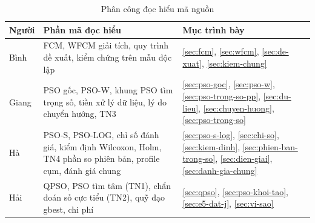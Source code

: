 \begin{table}[H]
\centering
\caption{Phân công đọc hiểu mã nguồn}\label{tab:pl-phan-cong}
\small
\begin{tabular}{@{}l>{\raggedright\arraybackslash}p{7.6cm}>{\raggedright\arraybackslash}p{3.6cm}@{}}
\toprule
\textbf{Người} & \textbf{Phần mã đọc hiểu} & \textbf{Mục trình bày} \\
\midrule
Bình & FCM, WFCM giải tích, quy trình đề xuất, kiểm chứng trên mẫu độc lập & \ref{sec:fcm}, \ref{sec:wfcm}, \ref{sec:de-xuat}, \ref{sec:kiem-chung} \\
Giang & PSO gốc, PSO-W, khung PSO tìm trọng số, tiền xử lý dữ liệu, lý do chuyển hướng, TN3 & \ref{sec:pso-goc}, \ref{sec:pso-w}, \ref{sec:pso-trong-so-pp}, \ref{sec:du-lieu}, \ref{sec:chuyen-huong}, \ref{sec:pso-trong-so} \\
Hà & PSO-S, PSO-LOG, chỉ số đánh giá, kiểm định Wilcoxon, Holm, TN4 phần so phiên bản, profile cụm, đánh giá chung & \ref{sec:pso-s-log}, \ref{sec:chi-so}, \ref{sec:kiem-dinh}, \ref{sec:phien-ban-trong-so}, \ref{sec:dien-giai}, \ref{sec:danh-gia-chung} \\
Hải & QPSO, PSO tìm tâm (TN1), chẩn đoán số cực tiểu (TN2), quỹ đạo gbest, chi phí & \ref{sec:qpso}, \ref{sec:pso-khoi-tao}, \ref{sec:e5-dat-j}, \ref{sec:vi-sao} \\
\bottomrule
\end{tabular}
\end{table}

